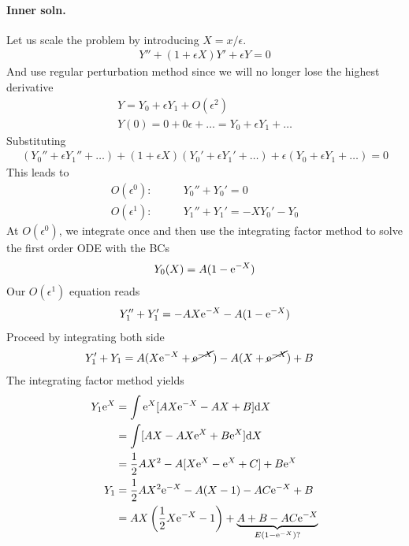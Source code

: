 \paragraph{Inner soln.} Let us scale the problem by introducing $X = x/\epsilon$. 
\begin{gather*}
	Y'' + (1+\epsilon X) Y' + \epsilon Y = 0
\end{gather*}
And use regular perturbation method since we will no longer lose the highest derivative
\begin{gather*}
	Y = Y_0 + \epsilon Y_1 + O(\epsilon^2) \\
	Y(0) = 0 + 0\epsilon + \dots = Y_0 + \epsilon Y_1 + \dots 
\end{gather*}
Substituting
\begin{gather*}
	(Y_0'' + \epsilon Y_1'' + \dots ) + (1+\epsilon X)(Y_0' + \epsilon Y_1'+\dots) + \epsilon (Y_0 + \epsilon Y_1 + \dots ) = 0
\end{gather*}
This leads to
\begin{align*}
	O(\epsilon^0): \qquad &Y_0'' + Y_0' = 0 \\
	O(\epsilon^1): \qquad &Y_1'' + Y_1' = -XY_0' - Y_0
\end{align*}
At $O(\epsilon^0)$, we integrate once and then use the integrating factor method to solve the first order ODE with the BCs
\begin{gather*}
	Y_0(X) = A(1-\mathrm{e}^{-X})
\end{gather*}
Our $O(\epsilon^1)$ equation reads
\begin{gather*}
	Y_1'' + Y_1' = -AX\mathrm{e}^{-X} - A(1-\mathrm{e}^{-X})
\end{gather*}
Proceed by integrating both side
\begin{align*}
	Y_1' + Y_1 &= A (X\mathrm{e}^{-X}+\cancel{\mathrm{e}^{-X}}) - A(X + \cancel{\mathrm{e}^{-X}}) + B
\end{align*}
The integrating factor method yields
\begin{align*}
	Y_1 \mathrm{e}^X &= \int \mathrm{e}^X [AX\mathrm{e}^{-X} - AX + B] \mathrm{d} X \\
	&= \int [AX - AX\mathrm{e}^X + B\mathrm{e}^X] \mathrm{d} X \\
	&= \frac{1}{2}AX^2 - A[X\mathrm{e}^X - \mathrm{e}^X + C] + B\mathrm{e}^X  \\
	Y_1 &= \frac{1}{2}AX^2 \mathrm{e}^{-X} - A(X-1) -AC\mathrm{e}^{-X} + B \\
	&= AX\left(\frac{1}{2}X\mathrm{e}^{-X} - 1\right) + \underbrace{A+B - AC\mathrm{e}^{-X}}_{E(1-\mathrm{e}^{-X})?}
\end{align*}
